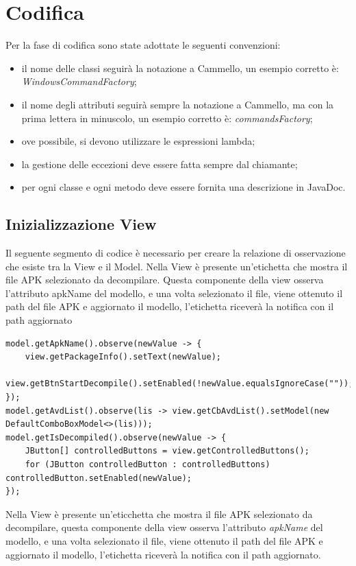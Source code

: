 \newpage
\section{Codifica}\label{sec:codifica}
Per la fase di codifica sono state adottate le seguenti convenzioni:
\begin{itemize}
    \item il nome delle classi seguirà la notazione a Cammello, un esempio corretto è: \textit{WindowsCommandFactory};
    \item il nome degli attributi seguirà sempre la notazione a Cammello, ma con la prima lettera in minuscolo, un esempio corretto è: \textit{commandsFactory};
    \item ove possibile, si devono utilizzare le espressioni lambda;
    \item la gestione delle eccezioni deve essere fatta sempre dal chiamante;
    \item per ogni classe e ogni metodo deve essere fornita una descrizione in JavaDoc.
\end{itemize}
\subsection{Inizializzazione View}\label{subsec:inizializzazione-view}
Il seguente segmento di codice è necessario per creare  la relazione di osservazione che esiste tra la View e il Model.
Nella View è presente un’etichetta che mostra il file APK selezionato da decompilare.
Questa componente della view osserva l’attributo apkName del modello, e una volta selezionato il file, viene ottenuto il path del file APK e aggiornato il modello, l’etichetta riceverà la notifica con il path aggiornato

\begin{lstlisting}[caption={Inizializzazione relazione di osservazione View e Model},label={lst:lstlisting}]
model.getApkName().observe(newValue -> {
    view.getPackageInfo().setText(newValue);
    view.getBtnStartDecompile().setEnabled(!newValue.equalsIgnoreCase(""));
});
model.getAvdList().observe(lis -> view.getCbAvdList().setModel(new DefaultComboBoxModel<>(lis)));
model.getIsDecompiled().observe(newValue -> {
    JButton[] controlledButtons = view.getControlledButtons();
    for (JButton controlledButton : controlledButtons) controlledButton.setEnabled(newValue);
});
\end{lstlisting}
Nella View è presente un'eticchetta che mostra il file APK selezionato da decompilare, questa componente della view osserva l'attributo \textit{apkName} del modello, e una volta selezionato il file, viene ottenuto il path del file APK e aggiornato il modello, l'etichetta riceverà la notifica con il path aggiornato.

